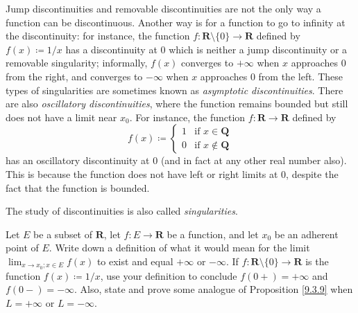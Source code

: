 \begin{remark}\label{9.5.4}
    Jump discontinuities and removable discontinuities are not the only way a function can be discontinuous.
    Another way is for a function to go to infinity at the discontinuity:
    for instance, the function \(f : \mathbf{R} \setminus \{0\} \to \mathbf{R}\) defined by \(f(x) \coloneqq 1 / x\) has a discontinuity at \(0\) which is neither a jump discontinuity or a removable singularity;
    informally, \(f(x)\) converges to \(+\infty\) when \(x\) approaches \(0\) from the right, and converges to \(-\infty\) when \(x\) approaches \(0\) from the left.
    These types of singularities are sometimes known as \emph{asymptotic discontinuities}.
    There are also \emph{oscillatory discontinuities}, where the function remains bounded but still does not have a limit near \(x_0\).
    For instance, the function \(f : \mathbf{R} \to \mathbf{R}\) defined by
    \[
        f(x) \coloneqq \begin{cases}
            1 & \text{if } x \in \mathbf{Q}    \\
            0 & \text{if } x \notin \mathbf{Q}
        \end{cases}
    \]
    has an oscillatory discontinuity at \(0\) (and in fact at any other real number also).
    This is because the function does not have left or right limits at \(0\), despite the fact that the function is bounded.
\end{remark}

\begin{note}
    The study of discontinuities is also called \emph{singularities}.
\end{note}

\exercisesection

\begin{exercise}\label{ex 9.5.1}
    Let \(E\) be a subset of \(\mathbf{R}\), let \(f : E \to \mathbf{R}\) be a function, and let \(x_0\) be an adherent point of \(E\).
    Write down a definition of what it would mean for the limit \(\lim_{x \to x_0 ; x \in E} f(x)\) to exist and equal \(+\infty\) or \(-\infty\).
    If \(f : \mathbf{R} \setminus \{0\} \to \mathbf{R}\) is the function \(f(x) \coloneqq 1 / x\), use your definition to conclude \(f(0+) = +\infty\) and \(f(0-) = -\infty\).
    Also, state and prove some analogue of Proposition \ref{9.3.9} when \(L = +\infty\) or \(L = -\infty\).
\end{exercise}

